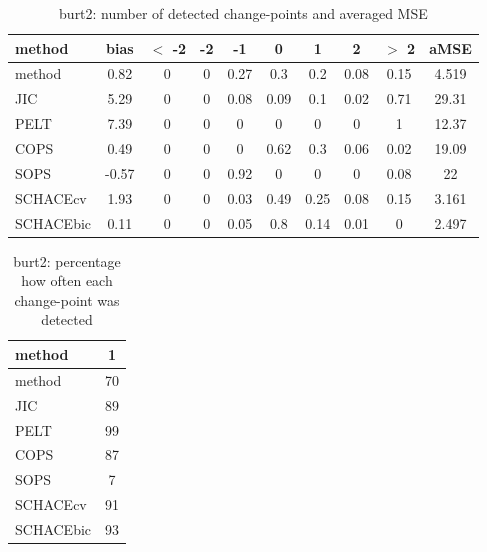\begin{table}[ht]
\centering
\begin{tabular}{l|c|ccccccc|c}
  \hline
method & bias & $<$ -2 & -2 & -1 & 0 & 1 & 2 & $>$ 2 & aMSE \\ 
  \hline
method &  0.82 &     0 &     0 &  0.27 &   0.3 &   0.2 &  0.08 &  0.15 & 4.519 \\ 
  JIC &  5.29 &     0 &     0 &  0.08 &  0.09 &   0.1 &  0.02 &  0.71 & 29.31 \\ 
  PELT &  7.39 &     0 &     0 &     0 &     0 &     0 &     0 &     1 & 12.37 \\ 
  COPS &  0.49 &     0 &     0 &     0 &  0.62 &   0.3 &  0.06 &  0.02 & 19.09 \\ 
  SOPS & -0.57 &     0 &     0 &  0.92 &     0 &     0 &     0 &  0.08 &    22 \\ 
  SCHACEcv &  1.93 &     0 &     0 &  0.03 &  0.49 &  0.25 &  0.08 &  0.15 & 3.161 \\ 
  SCHACEbic &  0.11 &     0 &     0 &  0.05 &   0.8 &  0.14 &  0.01 &     0 & 2.497 \\ 
   \hline
\end{tabular}
\caption{burt2: number of detected change-points and averaged MSE} 
\label{tab:burt2Njumps}
\end{table}
\begin{table}[ht]
\centering
\begin{tabular}{l|c}
  \hline
method & 1 \\ 
  \hline
method &     70 \\ 
  JIC &     89 \\ 
  PELT &     99 \\ 
  COPS &     87 \\ 
  SOPS &      7 \\ 
  SCHACEcv &     91 \\ 
  SCHACEbic &     93 \\ 
   \hline
\end{tabular}
\caption{burt2: percentage how often each change-point was detected} 
\label{tab:burt2Detections}
\end{table}
